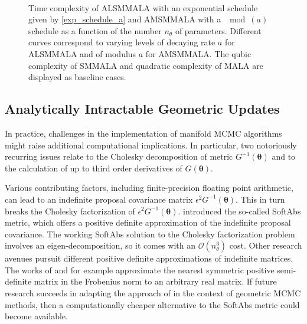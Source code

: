 \documentclass[twoside,11pt]{article}
\begin{document}
\begin{figure}[t]
	\centering
	 \\
	\caption{
		Time complexity of ALSMMALA with an exponential schedule given by \eqref{exp_schedule_a} and AMSMMALA with a $\mod{(a)}$ 
		schedule as a function of the number $n_{\theta}$ of parameters. Different curves correspond to varying levels of 
		decaying rate $a$ for ALSMMALA and of modulus $a$ for AMSMMALA. The qubic complexity of SMMALA and quadratic complexity
		of MALA are displayed as baseline cases.
	}
	\label{fig:alsmmala_amsmmala_schedule}
\end{figure}

\subsection{Analytically Intractable Geometric Updates}

In practice, challenges in the implementation of manifold MCMC algorithms might raise additional computational implications.
In particular, two notoriously recurring issues relate to the Cholesky decomposition of metric $G^{-1}(\boldsymbol{\theta})$ 
and to the calculation of up to third order derivatives of $G(\boldsymbol{\theta})$.

Various contributing factors, including finite-precision floating point arithmetic, can lead to an indefinite proposal
covariance matrix $\epsilon^2 G^{-1}(\boldsymbol{\theta})$. This in turn breaks the Cholesky factorization of 
$\epsilon^2 G^{-1}(\boldsymbol{\theta})$. \cite{bet__age} introduced the so-called SoftAbs metric, which offers a 
positive definite approximation of the indefinite proposal covariance. The working SoftAbs solution to the Cholesky 
factorization problem involves an eigen-decomposition, so it comes with an $\mathcal{O}(n_{\theta}^3)$ cost.
Other research avenues pursuit different positive definite approximations of indefinite matrices. The works of 
\cite{hig__com01} and \cite{hig__com02} for example approximate the nearest symmetric positive semi-definite matrix in the 
Frobenius norm to an arbitrary real matrix. If future research succeeds in adapting the approach of \cite{hig__com01} in the 
context of geometric MCMC methods, then a computationally cheaper alternative to the SoftAbs metric could become available.
\end{document}
